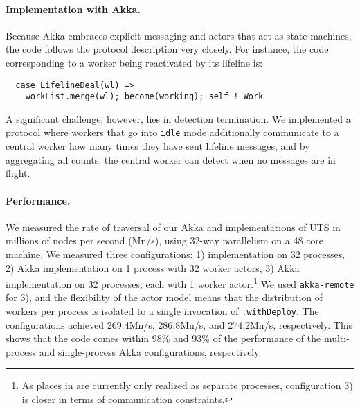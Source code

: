 
\paragraph{Implementation with Akka.} Because Akka embraces explicit messaging
and actors that act as state machines, the code follows the protocol
description very closely. For instance, the code corresponding to a worker
being reactivated by its lifeline is:
\begin{lstlisting}
  case LifelineDeal(wl) =>
    workList.merge(wl); become(working); self ! Work
\end{lstlisting}
A significant challenge, however, lies in detection termination. We implemented
a protocol where workers that go into \lstinline{idle} mode additionally
communicate to a central worker how many times they have sent lifeline
messages, and by aggregating all counts, the central worker can detect when no
messages are in flight.

% 
% 
% 
% 
% 



\paragraph{Performance.} We measured the rate of traversal of our Akka and
\apgas implementations of UTS in millions of nodes per second (Mn/s), using
32-way parallelism on a 48 core machine. We measured three configurations: 1)
\apgas implementation on 32 processes, 2) Akka implementation on 1 process with
32 worker actors, 3) Akka implementation on 32 processes, each with 1 worker
actor.\footnote{As places in \apgas are currently only realized as separate
processes, configuration 3) is closer in terms of communication constraints.}
We used \lstinline{akka-remote} for 3), and the flexibility of the actor model
means that the distribution of workers per process is isolated to a single
invocation of \lstinline{.withDeploy}. The configurations achieved 269.4Mn/s,
286.8Mn/s, and 274.2Mn/s, respectively. This shows that the \apgas code comes
within 98\% and 93\% of the performance of the multi-process and single-process
Akka configurations, respectively.

